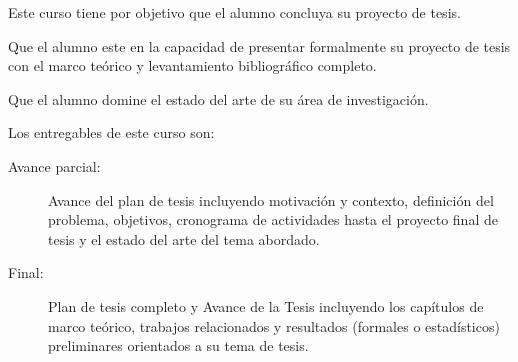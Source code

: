 \begin{syllabus}


\begin{justification}
Este curso tiene por objetivo que el alumno concluya su proyecto de tesis.
\end{justification}

\begin{goals}
\item Que el alumno este en la capacidad de presentar formalmente su proyecto de tesis con el marco teórico y levantamiento bibliográfico completo.
\item Que el alumno domine el estado del arte de su área de investigación.
\item Los entregables de este curso son:
	\begin{description}
	\item [Avance parcial:] Avance del plan de tesis incluyendo motivación y contexto, definición del problema, objetivos, cronograma de actividades hasta el proyecto final de tesis y el estado del arte del tema abordado.
	\item [Final:] Plan de tesis completo y Avance de la Tesis incluyendo los capítulos de marco teórico, trabajos relacionados y resultados (formales o estadísticos) preliminares orientados a su tema de tesis.
	\end{description}
\end{goals}

\begin{outcomes}
\item {}
\item {}
\item {}
\item {}
\item {}
\item {}
\item {}
\item {}
\end{outcomes}

\begin{competences}
\item {} 
\item {}
\item {}
\end{competences}


\end{syllabus}
